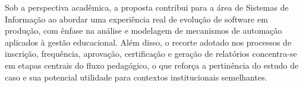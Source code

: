 Sob a perspectiva acadêmica, a proposta contribui para a área de Sistemas de
Informação ao abordar uma experiência real de evolução de software em produção,
com ênfase na análise e modelagem de mecanismos de automação aplicados à gestão
educacional. Além disso, o recorte adotado nos processos de inscrição,
frequência, aprovação, certificação e geração de relatórios concentra-se em
etapas centrais do fluxo pedagógico, o que reforça a pertinência do estudo de
caso e sua potencial utilidade para contextos institucionais semelhantes.
